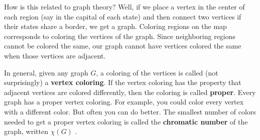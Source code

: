 \documentclass[10pt,]{book}
\newcommand{\terminology}[1]{\textbf{#1}}
\theoremstyle{plain}
\theoremstyle{definition}
\theoremstyle{definition}
\theoremstyle{definition}
\theoremstyle{definition}
\numberwithin{equation}{chapter}
\begin{document}
\par
\hypertarget{p-306}{}%
How is this related to graph theory? Well, if we place a vertex in the center of each region (say in the capital of each state) and then connect two vertices if their states share a border, we get a graph. Coloring regions on the map corresponds to coloring the vertices of the graph. Since neighboring regions cannot be colored the same, our graph cannot have vertices colored the same when those vertices are adjacent.%
\par
\hypertarget{p-307}{}%
In general, given any graph \(G\), a coloring of the vertices is called (not surprisingly) a \terminology{vertex coloring}. If the vertex coloring has the property that adjacent vertices are colored differently, then the coloring is called \terminology{proper}. Every graph has a proper vertex coloring. For example, you could color every vertex with a different color. But often you can do better. The smallest number of colors needed to get a proper vertex coloring is called the \terminology{chromatic number} of the graph, written \(\chi(G)\)\label{notation-6}
.%
\end{document}

